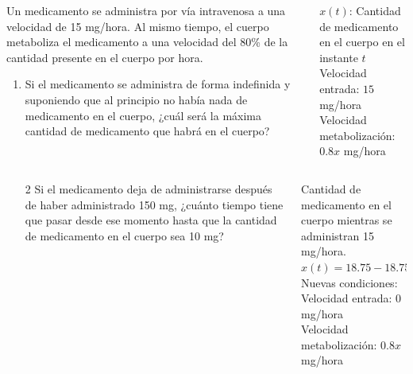 \documentclass[aspectratio=169,10pt,t]{beamer}
\begin{document}
\begin{frame}
\begin{columns}
\begin{column}[T]{0.65\textwidth}
Un medicamento se administra por vía intravenosa a una velocidad de 15 mg/hora. Al mismo tiempo, el cuerpo metaboliza el medicamento a una velocidad del 80\% de la cantidad presente en el cuerpo por hora. 

\begin{enumerate}
\item Si el medicamento se administra de forma indefinida y suponiendo que al principio no había nada de medicamento en el cuerpo, ¿cuál será la máxima cantidad de medicamento que habrá en el cuerpo?
\end{enumerate}
\end{column}
\quad
\begin{column}[T]{0.35\textwidth}
\begin{datos}
$x(t)$: Cantidad de medicamento en el cuerpo en el instante $t$\\
Velocidad entrada: $15$ mg/hora\\
Velocidad metabolización: $0.8x$ mg/hora 
\end{datos}
\end{column}
\end{columns}
\end{frame}


\begin{frame}
\begin{columns}
\begin{column}[T]{0.65\textwidth}
\begin{enumerate}
\item[2] Si el medicamento deja de administrarse después de haber administrado 150 mg, ¿cuánto tiempo tiene que pasar desde ese momento hasta que la cantidad de medicamento en el cuerpo sea 10 mg?
\end{enumerate}
\end{column}
\begin{column}[T]{0.35\textwidth}
\begin{datos}
Cantidad de medicamento en el cuerpo mientras se administran 15 mg/hora.\\
$x(t)=18.75-18.75e^{-0.8t}$\\
Nuevas condiciones:\\
Velocidad entrada: 0 mg/hora\\
Velocidad metabolización: $0.8x$ mg/hora
\end{datos}
\end{column}
\end{columns}
\end{frame}
\end{document}
